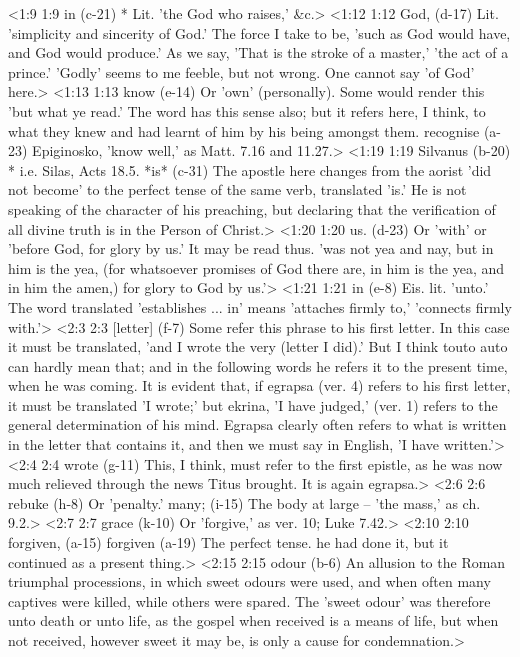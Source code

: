 <1:9 1:9  in (c-21)  * Lit. 'the God who raises,' &c.>
<1:12 1:12  God, (d-17)  Lit. 'simplicity and sincerity of God.' The force I take to  be, 'such as God would have, and God would produce.' As we say,  'That is the stroke of a master,' 'the act of a prince.'  'Godly' seems to me feeble, but not wrong. One cannot say 'of  God' here.>
<1:13 1:13  know (e-14)  Or 'own' (personally). Some would render this 'but what ye  read.' The word has this sense also; but it refers here, I  think, to what they knew and had learnt of him by his being  amongst them.
  recognise (a-23)  Epiginosko, 'know well,' as Matt. 7.16 and 11.27.>
<1:19 1:19  Silvanus (b-20)  * i.e. Silas, Acts 18.5.
  *is* (c-31)  The apostle here changes from the aorist 'did not become' to  the perfect tense of the same verb, translated 'is.' He is not  speaking of the character of his preaching, but declaring that  the verification of all divine truth is in the Person of  Christ.>
<1:20 1:20  us. (d-23)  Or 'with' or 'before God, for glory by us.' It may be read  thus. 'was not yea and nay, but in him is the yea, (for  whatsoever promises of God there are, in him is the yea, and in  him the amen,) for glory to God by us.'>
<1:21 1:21  in (e-8)  Eis. lit. 'unto.' The word translated 'establishes ... in'  means 'attaches firmly to,' 'connects firmly with.'>
<2:3 2:3  [letter] (f-7)  Some refer this phrase to his first letter. In this case it  must be translated, 'and I wrote the very (letter I did).' But  I think touto auto can hardly mean that; and in the following  words he refers it to the present time, when he was coming.  It is evident that, if egrapsa (ver. 4) refers to his first  letter, it must be translated 'I wrote;' but ekrina, 'I have  judged,' (ver. 1) refers to the general determination of his  mind. Egrapsa clearly often refers to what is written in the  letter that contains it, and then we must say in English, 'I  have written.'>
<2:4 2:4  wrote (g-11)  This, I think, must refer to the first epistle, as he was now  much relieved through the news Titus brought. It is again  egrapsa.>
<2:6 2:6  rebuke (h-8)  Or 'penalty.'
  many; (i-15)  The body at large -- 'the mass,' as ch. 9.2.>
<2:7 2:7  grace (k-10)  Or 'forgive,' as ver. 10; Luke 7.42.>
<2:10 2:10  forgiven, (a-15)  forgiven (a-19)
  The perfect tense. he had done it, but it continued as a  present thing.>
<2:15 2:15  odour (b-6)  An allusion to the Roman triumphal processions, in which  sweet odours were used, and when often many captives were  killed, while others were spared. The 'sweet odour' was  therefore unto death or unto life, as the gospel when received  is a means of life, but when not received, however sweet it may  be, is only a cause for condemnation.>
